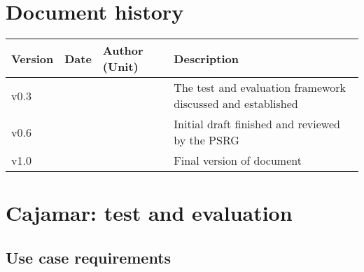 \documentclass[11pt, oneside]{article}   	%
\numberwithin{figure}{section}
\numberwithin{equation}{section}
\numberwithin{table}{section}
\begin{document}
%
%

%

\tableofcontents

\newpage


\section*{Document history}

\begin{table}[htbp]
  \centering
  \begin{tabularx}{\linewidth}{|p{13mm}| p{18mm}| X | X |} \hline
    {\bf Version} & {\bf Date} & {\bf Author (Unit)} & {\bf Description} \\ \hline
    v0.3 &  &  & The test and evaluation framework discussed and established \\ \hline
    v0.6 &  &  & Initial draft finished and reviewed by the PSRG  \\ \hline
    v1.0 &  & & Final version of document  \\ \hline
  \end{tabularx}
\end{table}

\newpage




%












\section{Cajamar: test and evaluation}

\subsection{Use case requirements}
\end{document}
